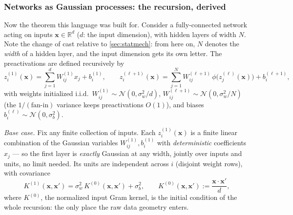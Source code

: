\documentclass[11pt]{article}
\newcommand{\R}{\mathbb{R}}
\newcommand{\bv}[1]{\boldsymbol{#1}}
\begin{document}
\subsubsection{Networks as Gaussian processes: the recursion, derived}
\label{sec:nngp-derivation}

Now the theorem this language was built for. Consider a fully-connected
network acting on inputs $\bv{x} \in \R^d$ ($d$: the input dimension),
with hidden layers of width $N$. Note the change of cast relative to
\cref{sec:statmech}: from here on, $N$ denotes the \emph{width} of a
hidden layer, and the input dimension gets its own letter. The
preactivations are defined recursively by
\begin{equation}
  \label{eq:preactivations}
  z^{(1)}_i(\bv{x}) = \sum_{j=1}^{d} W^{(1)}_{ij} x_j + b^{(1)}_i,
  \qquad
  z^{(\ell+1)}_i(\bv{x}) = \sum_{j=1}^{N} W^{(\ell+1)}_{ij}\,
  \phi\bigl(z^{(\ell)}_j(\bv{x})\bigr) + b^{(\ell+1)}_i,
\end{equation}
with weights initialized i.i.d.\ $W^{(1)}_{ij} \sim \mathcal{N}(0,
\sigma_w^2/d)$, $W^{(\ell+1)}_{ij} \sim \mathcal{N}(0, \sigma_w^2/N)$
(the $1/(\text{fan-in})$ variance keeps preactivations $O(1)$), and
biases $b^{(\ell)}_i \sim \mathcal{N}(0, \sigma_b^2)$.

\emph{Base case.} Fix any finite collection of inputs. Each
$z^{(1)}_i(\bv{x})$ is a finite linear combination of the Gaussian
variables $W^{(1)}_{ij}, b^{(1)}_i$ with \emph{deterministic}
coefficients $x_j$ --- so the first layer is \emph{exactly} Gaussian at
any width, jointly over inputs and units, no limit needed. Its units are
independent across $i$ (disjoint weight rows), with covariance
\begin{equation}
  \label{eq:K1}
  K^{(1)}(\bv{x},\bv{x}')
  = \sigma_w^2\, K^{(0)}(\bv{x},\bv{x}') + \sigma_b^2,
  \qquad
  K^{(0)}(\bv{x},\bv{x}') := \frac{\bv{x}\cdot\bv{x}'}{d},
\end{equation}
where $K^{(0)}$, the normalized input Gram kernel, is the initial
condition of the whole recursion: the only place the raw data geometry
enters.
\end{document}
